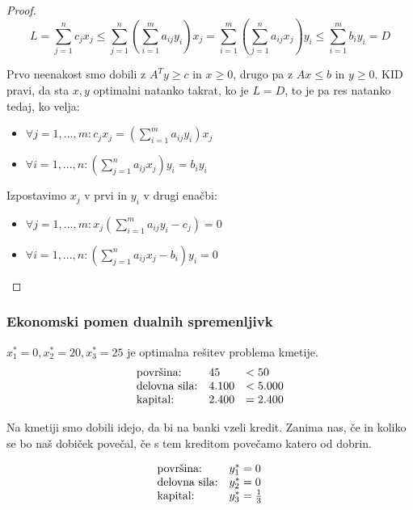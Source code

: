 \documentclass[11pt, a4paper]{article}
\begin{document}
    \begin{proof}
        \[L = \sum_{j=1}^n c_j x_j \le \sum_{j=1}^n (\sum_{i=1}^m a_{ij} y_i)x_j = \sum_{i=1}^m (\sum_{j=1}^n a_{ij} x_j)y_i \le \sum_{i=1}^m b_i y_i = D\]

        Prvo neenakost smo dobili z \(A^Ty \ge c\) in \(x \ge 0\), drugo pa z \(Ax \le b\) in \(y \ge 0\). KID pravi, da sta \(x,y\) optimalni natanko takrat, ko je \(L = D\), to je pa res natanko tedaj, ko velja:
        \begin{itemize}
            \item \(\displaystyle \forall j=1,...,m: c_j x_j = (\sum_{i=1}^m a_{ij} y_i)x_j\)
            \item \(\displaystyle \forall i=1,...,n: (\sum_{j=1}^n a_{ij} x_j)y_i = b_i y_i\)
        \end{itemize}

        Izpostavimo \(x_j\) v prvi in \(y_i\) v drugi enačbi:
        \begin{itemize}
            \item \(\displaystyle \forall j=1,...,m: x_j(\sum_{i=1}^m a_{ij} y_i - c_j) = 0\)
            \item \(\displaystyle \forall i=1,...,n: (\sum_{j=1}^n a_{ij} x_j - b_i)y_i = 0\)
        \end{itemize}
    \end{proof}

    \subsubsection{Ekonomski pomen dualnih spremenljivk}

    \begin{example}
        \(x_1^*=0,x_2^*=20,x_3^*=25\) je optimalna rešitev problema kmetije. 
        \[
            \begin{array}{ l l l }
                \text{površina:} & 45 & < 50 \\
                \text{delovna sila:} & 4.100  & < 5.000\\
                \text{kapital:} & 2.400 & = 2.400
            \end{array}
        \]

        Na kmetiji smo dobili idejo, da bi na banki vzeli kredit. Zanima nas, če in koliko se bo naš dobiček povečal, če s tem kreditom povečamo katero od dobrin.

        \[
            \begin{array}{ l l }
                \text{površina:} & y_1^*=0 \\
                \text{delovna sila:} & y_2^*=0 \\
                \text{kapital:} & y_3^*=\frac{1}{3}
            \end{array} 
        \]
    \end{example}
\end{document}
